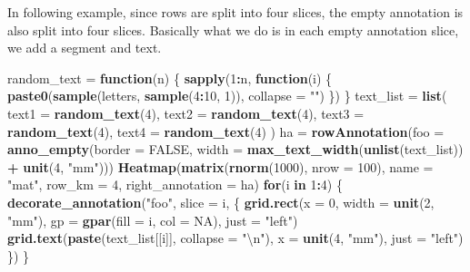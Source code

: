 \documentclass[]{book}
\newenvironment{Shaded}{\begin{snugshade}}{\end{snugshade}}
\newcommand{\KeywordTok}[1]{\textcolor[rgb]{0.13,0.29,0.53}{\textbf{#1}}}
\newcommand{\DataTypeTok}[1]{\textcolor[rgb]{0.13,0.29,0.53}{#1}}
\newcommand{\DecValTok}[1]{\textcolor[rgb]{0.00,0.00,0.81}{#1}}
\newcommand{\CharTok}[1]{\textcolor[rgb]{0.31,0.60,0.02}{#1}}
\newcommand{\StringTok}[1]{\textcolor[rgb]{0.31,0.60,0.02}{#1}}
\newcommand{\OtherTok}[1]{\textcolor[rgb]{0.56,0.35,0.01}{#1}}
\newcommand{\ControlFlowTok}[1]{\textcolor[rgb]{0.13,0.29,0.53}{\textbf{#1}}}
\newcommand{\OperatorTok}[1]{\textcolor[rgb]{0.81,0.36,0.00}{\textbf{#1}}}
\newcommand{\NormalTok}[1]{#1}
\theoremstyle{definition}
\theoremstyle{definition}
\theoremstyle{definition}
\theoremstyle{remark}
\begin{document}
In following example, since rows are split into four slices, the empty
annotation is also split into four slices. Basically what we do is in
each empty annotation slice, we add a segment and text.

\begin{Shaded}
\begin{Highlighting}[]
\NormalTok{random_text =}\StringTok{ }\ControlFlowTok{function}\NormalTok{(n) \{}
    \KeywordTok{sapply}\NormalTok{(}\DecValTok{1}\OperatorTok{:}\NormalTok{n, }\ControlFlowTok{function}\NormalTok{(i) \{}
        \KeywordTok{paste0}\NormalTok{(}\KeywordTok{sample}\NormalTok{(letters, }\KeywordTok{sample}\NormalTok{(}\DecValTok{4}\OperatorTok{:}\DecValTok{10}\NormalTok{, }\DecValTok{1}\NormalTok{)), }\DataTypeTok{collapse =} \StringTok{""}\NormalTok{)}
\NormalTok{    \})}
\NormalTok{\}}
\NormalTok{text_list =}\StringTok{ }\KeywordTok{list}\NormalTok{(}
    \DataTypeTok{text1 =} \KeywordTok{random_text}\NormalTok{(}\DecValTok{4}\NormalTok{),}
    \DataTypeTok{text2 =} \KeywordTok{random_text}\NormalTok{(}\DecValTok{4}\NormalTok{),}
    \DataTypeTok{text3 =} \KeywordTok{random_text}\NormalTok{(}\DecValTok{4}\NormalTok{),}
    \DataTypeTok{text4 =} \KeywordTok{random_text}\NormalTok{(}\DecValTok{4}\NormalTok{)}
\NormalTok{)}
\NormalTok{ha =}\StringTok{ }\KeywordTok{rowAnnotation}\NormalTok{(}\DataTypeTok{foo =} \KeywordTok{anno_empty}\NormalTok{(}\DataTypeTok{border =} \OtherTok{FALSE}\NormalTok{, }
    \DataTypeTok{width =} \KeywordTok{max_text_width}\NormalTok{(}\KeywordTok{unlist}\NormalTok{(text_list)) }\OperatorTok{+}\StringTok{ }\KeywordTok{unit}\NormalTok{(}\DecValTok{4}\NormalTok{, }\StringTok{"mm"}\NormalTok{)))}
\KeywordTok{Heatmap}\NormalTok{(}\KeywordTok{matrix}\NormalTok{(}\KeywordTok{rnorm}\NormalTok{(}\DecValTok{1000}\NormalTok{), }\DataTypeTok{nrow =} \DecValTok{100}\NormalTok{), }\DataTypeTok{name =} \StringTok{"mat"}\NormalTok{, }\DataTypeTok{row_km =} \DecValTok{4}\NormalTok{, }\DataTypeTok{right_annotation =}\NormalTok{ ha)}
\ControlFlowTok{for}\NormalTok{(i }\ControlFlowTok{in} \DecValTok{1}\OperatorTok{:}\DecValTok{4}\NormalTok{) \{}
    \KeywordTok{decorate_annotation}\NormalTok{(}\StringTok{"foo"}\NormalTok{, }\DataTypeTok{slice =}\NormalTok{ i, \{}
        \KeywordTok{grid.rect}\NormalTok{(}\DataTypeTok{x =} \DecValTok{0}\NormalTok{, }\DataTypeTok{width =} \KeywordTok{unit}\NormalTok{(}\DecValTok{2}\NormalTok{, }\StringTok{"mm"}\NormalTok{), }\DataTypeTok{gp =} \KeywordTok{gpar}\NormalTok{(}\DataTypeTok{fill =}\NormalTok{ i, }\DataTypeTok{col =} \OtherTok{NA}\NormalTok{), }\DataTypeTok{just =} \StringTok{"left"}\NormalTok{)}
        \KeywordTok{grid.text}\NormalTok{(}\KeywordTok{paste}\NormalTok{(text_list[[i]], }\DataTypeTok{collapse =} \StringTok{"}\CharTok{\textbackslash{}n}\StringTok{"}\NormalTok{), }\DataTypeTok{x =} \KeywordTok{unit}\NormalTok{(}\DecValTok{4}\NormalTok{, }\StringTok{"mm"}\NormalTok{), }\DataTypeTok{just =} \StringTok{"left"}\NormalTok{)}
\NormalTok{    \})}
\NormalTok{\}}
\end{Highlighting}
\end{Shaded}
\end{document}
